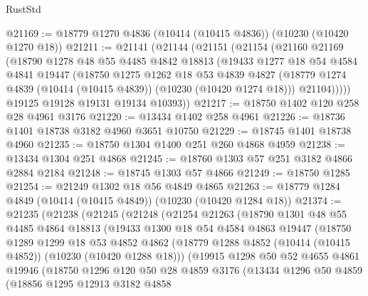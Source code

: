 \begin{lexlean}{RustStd}
\begin{coremodule}
@21169 := @18779 @1270 @4836 (@10414 (@10415 @4836)) (@10230 (@10420 @1270 @18))
@21211 := @21141
    (@21144
      (@21151
        (@21154
          (@21160
            @21169
            (@18790
              @1278
              @48
              @55
              @4485
              @4842
              @18813
              (@19433
                @1277
                @18
                @54
                @4584
                @4841
                @19447
                (@18750
                  @1275
                  @1262
                  @18
                  @53
                  @4839
                  @4827
                  (@18779 @1274 @4839 (@10414 (@10415 @4839)) (@10230 (@10420 @1274 @18)))
                  @21104)))))
        @19125
        @19128
        @19131
        @19134
        @10393))
@21217 := @18750 @1402 @120 @258 @28 @4961 @3176
@21220 := @13434 @1402 @258 @4961
@21226 := @18736 @1401 @18738 @3182 @4960 @3651 @10750
@21229 := @18745 @1401 @18738 @4960
@21235 := @18750 @1304 @1400 @251 @260 @4868 @4959
@21238 := @13434 @1304 @251 @4868
@21245 := @18760 @1303 @57 @251 @3182 @4866 @2884 @2184
@21248 := @18745 @1303 @57 @4866
@21249 := @18750 @1285
@21254 := @21249 @1302 @18 @56 @4849 @4865
@21263 := @18779 @1284 @4849 (@10414 (@10415 @4849)) (@10230 (@10420 @1284 @18))
@21374 := @21235
    (@21238
      (@21245
        (@21248
          (@21254
            @21263
            (@18790
              @1301
              @48
              @55
              @4485
              @4864
              @18813
              (@19433
                @1300
                @18
                @54
                @4584
                @4863
                @19447
                (@18750
                  @1289
                  @1299
                  @18
                  @53
                  @4852
                  @4862
                  (@18779 @1288 @4852 (@10414 (@10415 @4852)) (@10230 (@10420 @1288 @18)))
                  (@19915
                    @1298
                    @50
                    @52
                    @4655
                    @4861
                    @19946
                    (@18750
                      @1296
                      @120
                      @50
                      @28
                      @4859
                      @3176
                      (@13434
                        @1296
                        @50
                        @4859
                        (@18856
                          @1295
                          @12913
                          @3182
                          @4858

\end{coremodule}
\end{lexlean}
